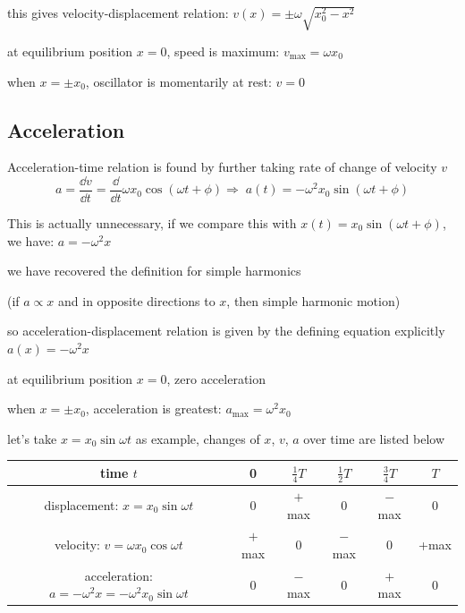 \documentclass[a4paper,12pt]{book}
\newcounter{example}[chapter]
\newcommand{\cmt}{}
\newcommand{\tmax}{\text{max}}
\newcommand{\RA}{\Rightarrow\;}
\newcommand{\tcbhighmath}[1]{\boxed{#1}}
\newcommand{\cmt}{}
\begin{document}
this gives velocity-displacement relation: $\tcbhighmath{v(x)=\pm \omega\sqrt{x_0^2 - x^2}}$

\cmt at equilibrium position $x=0$, speed is maximum: $\tcbhighmath{v_\tmax = \omega x_0}$ 

\cmt when $x=\pm x_0$, oscillator is momentarily at rest: $v=0$ 

\subsection*{Acceleration}

Acceleration-time relation is found by further taking rate of change of velocity $v$
\begin{equation*}
a = \frac{\dd v}{\dd t} = \frac{\dd}{\dd t} \omega x_0 \cos(\omega t+\phi) \RA \tcbhighmath{a(t) = - \omega^2 x_0 \sin(\omega t+\phi)}
\end{equation*}

This is actually unnecessary, if we compare this with $x(t)=x_0 \sin(\omega t+\phi)$, we have: $a=-\omega^2 x$

we have recovered the definition for simple harmonics

(if $a \propto x$ and in opposite directions to $x$, then simple harmonic motion)

so acceleration-displacement relation is given by the defining equation explicitly $\tcbhighmath{a(x) = -\omega^2 x} $

\cmt at equilibrium position $x=0$, zero acceleration

\cmt when $x=\pm x_0$, acceleration is greatest: $\tcbhighmath{a_\tmax = \omega^2 x_0}$ 

\vspace*{\baselineskip}

let's take $x=x_0\sin\omega t$ as example, changes of $x$, $v$, $a$ over time are listed below

\begin{center}
\begin{tabular}{|c|c|c|c|c|c|}
\hline
time $t$ & 0 & $\textstyle{\frac{1}{4}T}$ & $\textstyle{\frac{1}{2}T}$  & $\textstyle{\frac{3}{4}T}$ & $T$ \\ \hline
displacement: $x=x_0\sin\omega t$ & 0 & $+$max & 0 & $-$max & 0 \\ \hline
velocity: $v=\omega x_0\cos \omega t$ & $+$max & 0 & $-$max & 0 & +max \\ \hline
acceleration: $a=-\omega^2x = -\omega^2 x_0\sin\omega t$ & 0 & $-$max & 0 & $+$max & 0 \\
\hline
\end{tabular}
\end{center}
\end{document}
